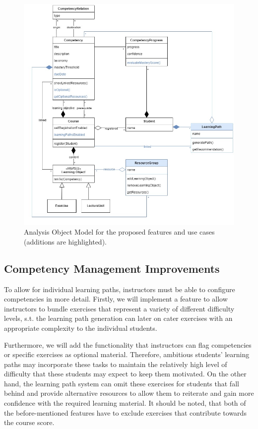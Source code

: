 \documentclass[a4paper,12pt,twoside]{article}
\begin{document}
\begin{figure}[h!]
        \centering
        \includegraphics[width=\linewidth]{figures/ObjectModel (5).jpg}
        \caption{Analysis Object Model for the proposed features and use cases (additions are highlighted).}
        \label{fig:AOM}
\end{figure}

\subsection{Competency Management Improvements}
To allow for individual learning paths, instructors must be able to configure competencies in more detail. Firstly, we will implement a feature to allow
instructors to bundle exercises that represent a variety of different difficulty levels, s.t. the learning path generation can later on cater exercises
with an appropriate complexity to the individual students.

Furthermore, we will add the functionality that instructors can flag competencies or specific exercises as optional material. Therefore, ambitious students' learning paths
may incorporate these tasks to maintain the relatively high level of difficulty that these students may expect to keep them motivated.
On the other hand, the learning path system can omit these exercises for students that fall behind and provide alternative resources to allow them
to reiterate and gain more confidence with the required learning material.
It should be noted, that both of the before-mentioned features have to exclude exercises that contribute towards the course score.
\end{document}
